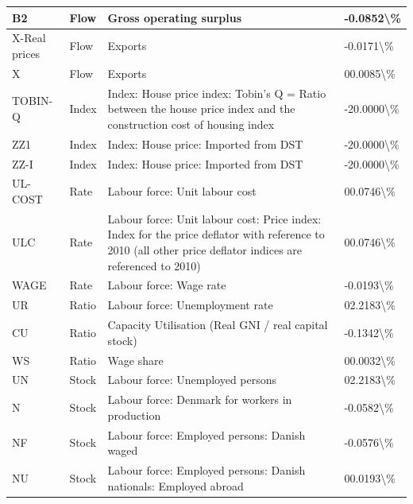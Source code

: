 \documentclass[
]{book}
\begin{document}
\begin{table}
\begin{tabular}[t]{l|l|l|l}
\hline
B2 & Flow & Gross operating surplus & -0.0852\textbackslash{}\%\\
\hline
X-Real prices & Flow & Exports & -0.0171\textbackslash{}\%\\
\hline
X & Flow & Exports & 00.0085\textbackslash{}\%\\
\hline
TOBIN-Q & Index & Index: House price index: Tobin's Q = Ratio between the house price index and the construction cost of housing index & -20.0000\textbackslash{}\%\\
\hline
ZZ1 & Index & Index: House price: Imported from DST & -20.0000\textbackslash{}\%\\
\hline
ZZ-I & Index & Index: House price: Imported from DST & -20.0000\textbackslash{}\%\\
\hline
UL-COST & Rate & Labour force: Unit labour cost & 00.0746\textbackslash{}\%\\
\hline
ULC & Rate & Labour force: Unit labour cost: Price index: Index for the price deflator with reference to 2010 (all other price deflator indices are referenced to 2010) & 00.0746\textbackslash{}\%\\
\hline
WAGE & Rate & Labour force: Wage rate & -0.0193\textbackslash{}\%\\
\hline
UR & Ratio & Labour force: Unemployment rate & 02.2183\textbackslash{}\%\\
\hline
CU & Ratio & Capacity Utilisation (Real GNI  /  real capital stock) & -0.1342\textbackslash{}\%\\
\hline
WS & Ratio & Wage share & 00.0032\textbackslash{}\%\\
\hline
UN & Stock & Labour force: Unemployed persons & 02.2183\textbackslash{}\%\\
\hline
N & Stock & Labour force: Denmark for workers in production & -0.0582\textbackslash{}\%\\
\hline
NF & Stock & Labour force: Employed persons: Danish waged & -0.0576\textbackslash{}\%\\
\hline
NU & Stock & Labour force: Employed persons: Danish nationals: Employed abroad & 00.0193\textbackslash{}\%\\
\hline
\end{tabular}
\end{table}
\end{document}
